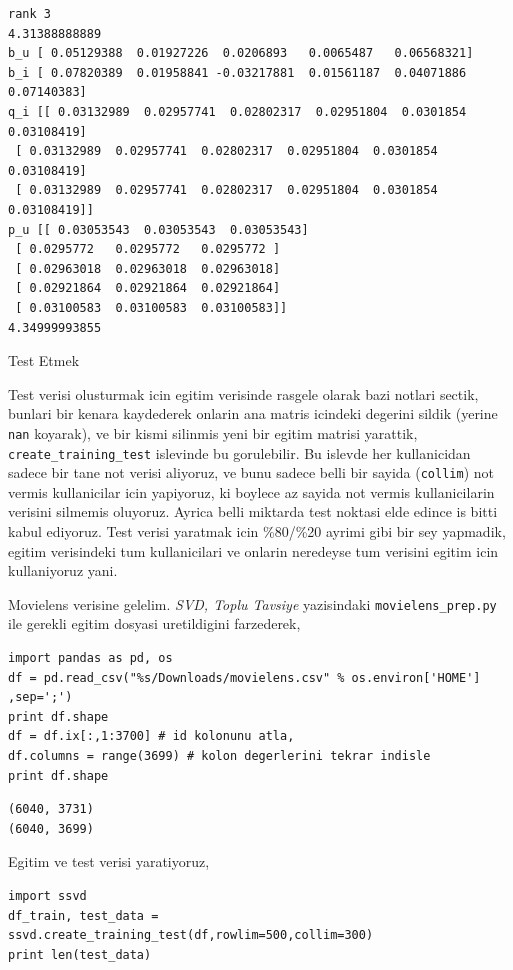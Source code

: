 \documentclass[12pt,fleqn]{article}\usepackage{../common}
\begin{document}
\begin{verbatim}
rank 3
4.31388888889
b_u [ 0.05129388  0.01927226  0.0206893   0.0065487   0.06568321]
b_i [ 0.07820389  0.01958841 -0.03217881  0.01561187  0.04071886  0.07140383]
q_i [[ 0.03132989  0.02957741  0.02802317  0.02951804  0.0301854   0.03108419]
 [ 0.03132989  0.02957741  0.02802317  0.02951804  0.0301854   0.03108419]
 [ 0.03132989  0.02957741  0.02802317  0.02951804  0.0301854   0.03108419]]
p_u [[ 0.03053543  0.03053543  0.03053543]
 [ 0.0295772   0.0295772   0.0295772 ]
 [ 0.02963018  0.02963018  0.02963018]
 [ 0.02921864  0.02921864  0.02921864]
 [ 0.03100583  0.03100583  0.03100583]]
4.34999993855
\end{verbatim}

Test Etmek

Test verisi olusturmak icin egitim verisinde rasgele olarak bazi notlari
sectik, bunlari bir kenara kaydederek onlarin ana matris icindeki degerini
sildik (yerine \verb!nan!  koyarak), ve bir kismi silinmis yeni bir egitim
matrisi yarattik, \verb!create_training_test! islevinde bu gorulebilir. Bu
islevde her kullanicidan sadece bir tane not verisi aliyoruz, ve bunu
sadece belli bir sayida (\verb!collim!) not vermis kullanicilar icin
yapiyoruz, ki boylece az sayida not vermis kullanicilarin verisini silmemis
oluyoruz. Ayrica belli miktarda test noktasi elde edince is bitti kabul
ediyoruz. Test verisi yaratmak icin \%80/\%20 ayrimi gibi bir sey yapmadik,
egitim verisindeki tum kullanicilari ve onlarin neredeyse tum verisini
egitim icin kullaniyoruz yani.

Movielens verisine gelelim. {\em SVD, Toplu Tavsiye} yazisindaki
\verb!movielens_prep.py! ile gerekli egitim dosyasi uretildigini
farzederek,

\begin{verbatim}
import pandas as pd, os
df = pd.read_csv("%s/Downloads/movielens.csv" % os.environ['HOME'] ,sep=';')
print df.shape
df = df.ix[:,1:3700] # id kolonunu atla,
df.columns = range(3699) # kolon degerlerini tekrar indisle
print df.shape
\end{verbatim}

\begin{verbatim}
(6040, 3731)
(6040, 3699)
\end{verbatim}

Egitim ve test verisi yaratiyoruz,

\begin{verbatim}
import ssvd
df_train, test_data = ssvd.create_training_test(df,rowlim=500,collim=300)
print len(test_data)
\end{verbatim}
\end{document}
